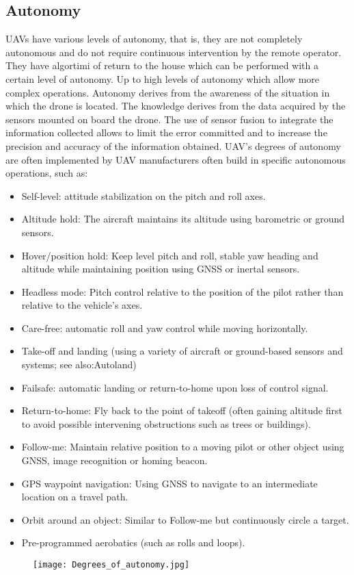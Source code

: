 \subsection{Autonomy}
\label{ssec:autonomy}
%
UAVs have various levels of autonomy, that is, they are not completely
autonomous and do not require continuous intervention by the remote operator.
They have algortimi of return to the house which can be performed with a certain
level of autonomy. 
Up to high levels of autonomy which allow more complex operations. 
Autonomy derives from the awareness of the situation in which the drone is
located. 
The knowledge derives from the data acquired by the sensors mounted on board the
drone. 
The use of sensor fusion to integrate the information collected allows to limit
the error committed and to increase the precision and accuracy of the
information obtained. 
UAV's degrees of autonomy are often implemented by UAV manufacturers often build
in specific autonomous operations, such as:
\begin{itemize}
	\item Self-level: attitude stabilization on the pitch and roll axes.
	\item Altitude hold: The aircraft maintains its altitude using barometric or ground sensors.
	\item Hover/position hold: Keep level pitch and roll, stable yaw heading and altitude while maintaining position using GNSS or inertal sensors.
	\item Headless mode: Pitch control relative to the position of the pilot rather than relative to the vehicle's axes.
	\item Care-free: automatic roll and yaw control while moving horizontally.
	\item Take-off and landing (using a variety of aircraft or ground-based sensors and systems; see also:Autoland)
	\item Failsafe: automatic landing or return-to-home upon loss of control signal.
	\item Return-to-home: Fly back to the point of takeoff (often gaining altitude first to avoid possible intervening obstructions such as trees or buildings).
	\item Follow-me: Maintain relative position to a moving pilot or other object using GNSS, image recognition or homing beacon.
	\item GPS waypoint navigation: Using GNSS to navigate to an intermediate location on a travel path.
	\item Orbit around an object: Similar to Follow-me but continuously circle a target.
	\item Pre-programmed aerobatics (such as rolls and loops).\cite{wiki:uav}
\end{itemize}
%
%
\begin{figure}[htb]
	\centering
    \texttt{[image: Degrees\_of\_autonomy.jpg]}
    \label{fig:uav-autonomy}
\end{figure}
%